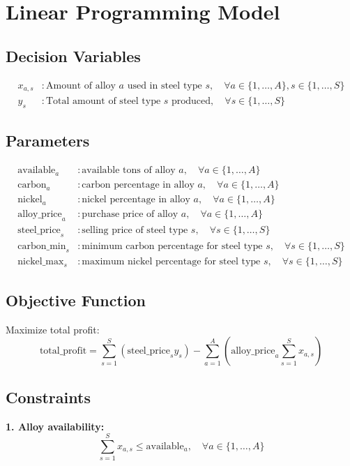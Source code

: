 \documentclass{article}
\begin{document}
\section*{Linear Programming Model}

\subsection*{Decision Variables}
\begin{align*}
x_{a,s} & : \text{Amount of alloy } a \text{ used in steel type } s, \quad \forall a \in \{1, \ldots, A\}, s \in \{1, \ldots, S\} \\
y_s & : \text{Total amount of steel type } s \text{ produced}, \quad \forall s \in \{1, \ldots, S\}
\end{align*}

\subsection*{Parameters}
\begin{align*}
\text{available}_a & : \text{available tons of alloy } a, \quad \forall a \in \{1, \ldots, A\} \\
\text{carbon}_{a} & : \text{carbon percentage in alloy } a, \quad \forall a \in \{1, \ldots, A\} \\
\text{nickel}_{a} & : \text{nickel percentage in alloy } a, \quad \forall a \in \{1, \ldots, A\} \\
\text{alloy\_price}_{a} & : \text{purchase price of alloy } a, \quad \forall a \in \{1, \ldots, A\} \\
\text{steel\_price}_{s} & : \text{selling price of steel type } s, \quad \forall s \in \{1, \ldots, S\} \\
\text{carbon\_min}_{s} & : \text{minimum carbon percentage for steel type } s, \quad \forall s \in \{1, \ldots, S\} \\
\text{nickel\_max}_{s} & : \text{maximum nickel percentage for steel type } s, \quad \forall s \in \{1, \ldots, S\}
\end{align*}

\subsection*{Objective Function}
Maximize total profit:
\[
\text{total\_profit} = \sum_{s=1}^{S} (\text{steel\_price}_{s} y_s) - \sum_{a=1}^{A} (\text{alloy\_price}_{a} \sum_{s=1}^{S} x_{a,s})
\]

\subsection*{Constraints}
\textbf{1. Alloy availability:}
\[
\sum_{s=1}^{S} x_{a,s} \leq \text{available}_a, \quad \forall a \in \{1, \ldots, A\}
\]
\end{document}
